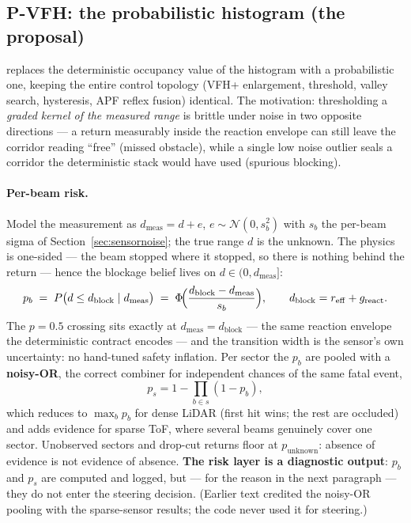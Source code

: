 \subsection{P-VFH: the probabilistic histogram (the proposal)}
\label{sec:pvfh}

 replaces the deterministic occupancy value of the
histogram with a probabilistic one, keeping the entire control topology
(VFH+ enlargement, threshold, valley search, hysteresis, APF reflex fusion)
identical. The motivation: thresholding a \emph{graded kernel of the measured
range} is brittle under noise in two opposite directions --- a return
measurably inside the reaction envelope can still leave the corridor reading
``free'' (missed obstacle), while a single low noise outlier seals a corridor
the deterministic stack would have used (spurious blocking).

\paragraph{Per-beam risk.} Model the measurement as
$d_{\mathrm{meas}} = d + e$, $e \sim \mathcal{N}(0, s_b^2)$ with $s_b$ the
per-beam sigma of Section~\ref{sec:sensornoise}; the true range $d$ is the
unknown. The physics is one-sided --- the beam stopped where it stopped, so
there is nothing behind the return --- hence the blockage belief lives on
$d \in (0, d_{\mathrm{meas}}]$:
\begin{equation}
p_b \;=\; P\bigl(d \le d_{\mathrm{block}} \mid d_{\mathrm{meas}}\bigr)
\;=\; \Phi\!\Bigl(\frac{d_{\mathrm{block}} - d_{\mathrm{meas}}}{s_b}\Bigr),
\qquad d_{\mathrm{block}} = r_{\mathrm{eff}} + g_{\mathrm{react}}.
\label{eq:prise}
\end{equation}
The $p = 0.5$ crossing sits exactly at $d_{\mathrm{meas}} = d_{\mathrm{block}}$
--- the same reaction envelope the deterministic  contract
encodes --- and the transition width is the sensor's own uncertainty: no
hand-tuned safety inflation. Per sector the $p_b$ are pooled with a
\textbf{noisy-OR}, the correct combiner for independent chances of the same
fatal event,
\begin{equation}
p_s = 1 - \prod_{b \in s} (1 - p_b),
\label{eq:noisyor}
\end{equation}
which reduces to $\max_b p_b$ for dense LiDAR (first hit wins; the rest are
occluded) and adds evidence for sparse ToF, where several beams genuinely
cover one sector. Unobserved sectors and drop-cut returns floor at
$p_{\mathrm{unknown}}$: absence of evidence is not evidence of absence.
\textbf{The risk layer is a diagnostic output}: $p_b$ and $p_s$ are computed
and logged, but --- for the reason in the next paragraph --- they do not
enter the steering decision. (Earlier text credited the noisy-OR pooling
with the sparse-sensor results; the code never used it for steering.)

